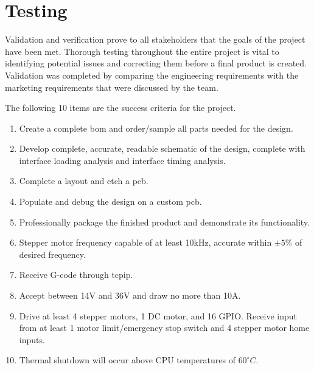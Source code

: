 \newcommand{\testheader}{\textrotate{\textbf{Step}} & \textbf{Action} & \textbf{Expected Result} & \textrotate{\textbf{Pass}} & \textrotate{\textbf{Fail}} & \textrotate{\textbf{N/A}} & \textbf{Comments} \\ \hline}
\newcommand{\testinfo}[2]{\multicolumn{2}{|r|}{\textbf{Test Case Name:}} & \multicolumn{5}{m{11cm}|}{#1} \\ \hline \multicolumn{2}{|r|}{\textbf{Description:}} & \multicolumn{5}{m{11cm}|}{#2} \\ \hline}
\newcommand{\testerinfo}{\multicolumn{2}{|r|}{\textbf{Name of Tester:}} & & \multicolumn{3}{l|}{\textbf{Date:}} & \\ \hline \multicolumn{2}{|r|}{\textbf{HW/SW Version:}} & & \multicolumn{3}{l|}{\textbf{Time:}} & \\ \hline}
\newcommand{\testsetup}[1]{\multicolumn{2}{|r|}{\textbf{Setup:}} & \multicolumn{5}{m{11cm}|}{#1} \\ \hline}
\newcommand{\testtabular}[3]{\begin{tabular}{|m{.25cm}|m{4cm}|m{5cm}|m{.25cm}|m{.25cm}|m{.25cm}|m{3cm}|}\hline\testinfo{#1}{#2}\testerinfo\testsetup{#3}\testheader}

\chapter{Testing}
Validation and verification prove to all stakeholders that the goals of the project have been met.
Thorough testing throughout the entire project is vital to identifying potential issues and correcting them before a final product is created. 
Validation was completed by comparing the engineering requirements with the marketing requirements that were discussed by the team. 

The following 10 items are the success criteria for the project. 
\begin{enumerate}
	\item Create a complete \gls{bom} and order/sample all parts needed for the design.
	\item Develop complete, accurate, readable schematic of the design, complete with interface loading analysis and interface timing analysis. 
	\item Complete a layout and etch a \gls{pcb}.
	\item Populate and debug the design on a custom \gls{pcb}.
	\item Professionally package the finished product and demonstrate its functionality.
	\item Stepper motor frequency capable of at least 10kHz, accurate within $\pm5\%$ of desired frequency.
	\item Receive G-code through \gls{tcpip}.
	\item Accept between 14V and 36V and draw no more than 10A.
	\item Drive at least 4 stepper motors, 1 DC motor, and 16 GPIO. Receive input from at least 1 motor limit/emergency stop switch and 4 stepper motor home inputs.
	\item Thermal shutdown will occur above CPU temperatures of $60^{\circ}C$.
\end{enumerate}
